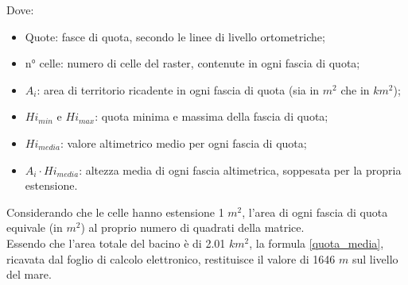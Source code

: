 \noindent Dove:
\begin{itemize}
    \item Quote: fasce di quota, secondo le linee di livello ortometriche;
    \item n° celle: numero di celle del raster, contenute in ogni fascia di quota;
    \item $A_i$: area di territorio ricadente in ogni fascia di quota (sia in $m^2$ che in $km^2$);
    \item $Hi_{min}$ e $Hi_{max}$: quota minima e massima della fascia di quota;
    \item $Hi_{media}$: valore altimetrico medio per ogni fascia di quota;
    \item $A_i \cdot Hi_{media}$: altezza media di ogni fascia altimetrica, soppesata per la propria estensione.
\end{itemize}
Considerando che le celle hanno estensione 1 $m^2$, l'area di ogni fascia di quota equivale (in $m^2$) al proprio numero di quadrati della matrice.\\
Essendo che l'area totale del bacino è di 2.01 $km^2$, la formula \ref{quota_media}, ricavata dal foglio di calcolo elettronico, restituisce il valore di 1646 $m$ sul livello del mare.

